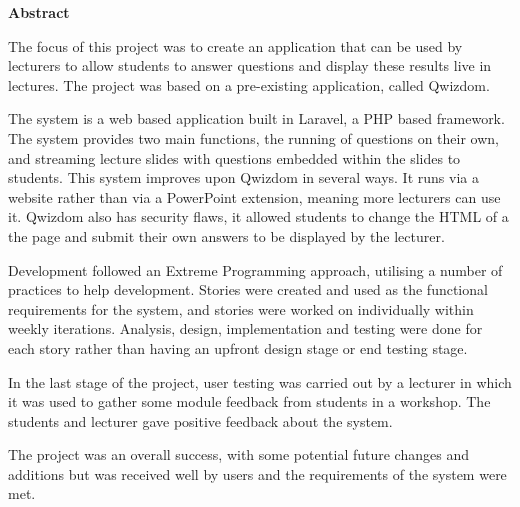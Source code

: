 \thispagestyle{empty}

\begin{center}
    {\LARGE\bf Abstract}
\end{center}

The focus of this project was to create an application that can be used by lecturers to allow students to answer questions and display these results live in lectures. The project was based on a pre-existing application, called Qwizdom.

The system is a web based application built in Laravel, a PHP based framework. The system provides two main functions, the running of questions on their own, and streaming lecture slides with questions embedded within the slides to students. This system improves upon Qwizdom in several ways. It runs via a website rather than via a PowerPoint extension, meaning more lecturers can use it. Qwizdom also has security flaws, it allowed students to change the HTML of a the page and submit their own answers to be displayed by the lecturer.

Development followed an Extreme Programming approach, utilising a number of practices to help development. Stories were created and used as the functional requirements for the system, and stories were worked on individually within weekly iterations. Analysis, design, implementation and testing were done for each story rather than having an upfront design stage or end testing stage.

In the last stage of the project, user testing was carried out by a lecturer in which it was used to gather some module feedback from students in a workshop. The students and lecturer gave positive feedback about the system.

The project was an overall success, with some potential future changes and additions but was received well by users and the requirements of the system were met.